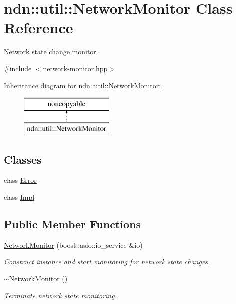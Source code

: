 \hypertarget{classndn_1_1util_1_1NetworkMonitor}{}\section{ndn\+:\+:util\+:\+:Network\+Monitor Class Reference}
\label{classndn_1_1util_1_1NetworkMonitor}


Network state change monitor.  




{\ttfamily \#include $<$network-\/monitor.\+hpp$>$}

Inheritance diagram for ndn\+:\+:util\+:\+:Network\+Monitor\+:\begin{figure}[H]
\begin{center}
\leavevmode
\includegraphics[height=2.000000cm]{classndn_1_1util_1_1NetworkMonitor}
\end{center}
\end{figure}
\subsection*{Classes}
\begin{DoxyCompactItemize}
\item 
class \hyperlink{classndn_1_1util_1_1NetworkMonitor_1_1Error}{Error}
\item 
class \hyperlink{classndn_1_1util_1_1NetworkMonitor_1_1Impl}{Impl}
\end{DoxyCompactItemize}
\subsection*{Public Member Functions}
\begin{DoxyCompactItemize}
\item 
\hyperlink{classndn_1_1util_1_1NetworkMonitor_aef8f9ab0a31e91cf07aa921b7859782c}{Network\+Monitor} (boost\+::asio\+::io\+\_\+service \&io)
\begin{DoxyCompactList}\small\item\em Construct instance and start monitoring for network state changes. \end{DoxyCompactList}\item 
\hyperlink{classndn_1_1util_1_1NetworkMonitor_a597b95735866a797dfd66cd5b6c47921}{$\sim$\+Network\+Monitor} ()\hypertarget{classndn_1_1util_1_1NetworkMonitor_a597b95735866a797dfd66cd5b6c47921}{}\label{classndn_1_1util_1_1NetworkMonitor_a597b95735866a797dfd66cd5b6c47921}

\begin{DoxyCompactList}\small\item\em Terminate network state monitoring. \end{DoxyCompactList}\end{DoxyCompactItemize}
